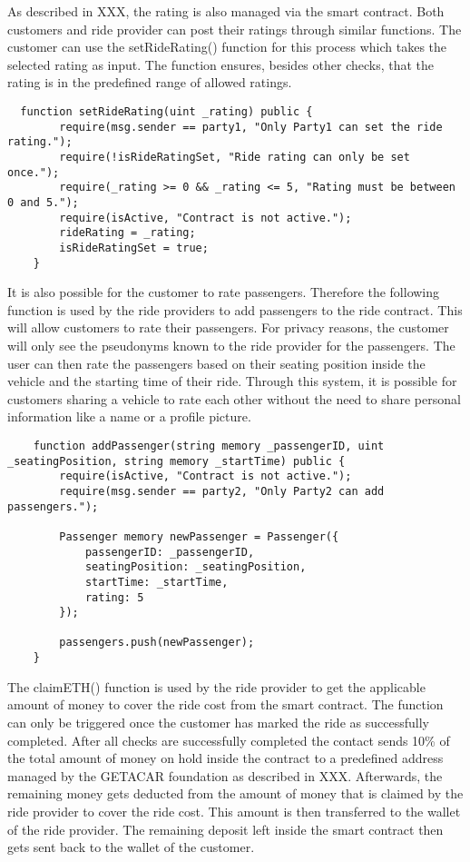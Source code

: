 As described in XXX, the rating is also managed via the smart contract. Both customers and ride provider can post their ratings through similar functions. The customer can use the setRideRating() function for this process which takes the selected rating as input.
The function ensures, besides other checks, that the rating is in the predefined range of allowed ratings. 

\lstset{
  basicstyle=\footnotesize\ttfamily,
  breaklines=true,
  numbers=left,
  firstnumber=222
}
\begin{lstlisting}
  function setRideRating(uint _rating) public {
        require(msg.sender == party1, "Only Party1 can set the ride rating.");
        require(!isRideRatingSet, "Ride rating can only be set once.");
        require(_rating >= 0 && _rating <= 5, "Rating must be between 0 and 5.");
        require(isActive, "Contract is not active.");
        rideRating = _rating;
        isRideRatingSet = true;
    }
\end{lstlisting}

It is also possible for the customer to rate passengers. Therefore the following function is used by the ride providers to add passengers to the ride contract. This will allow customers to rate their passengers. For privacy reasons, the customer will only see the pseudonyms known to the ride provider for the passengers. The user can then rate the passengers based on their seating position inside the vehicle and the starting time of their ride. Through this system, it is possible for customers sharing a vehicle to rate each other without the need to share personal information like a name or a profile picture. 

\lstset{
  basicstyle=\footnotesize\ttfamily,
  breaklines=true,
  numbers=left,
  firstnumber=53
}
\begin{lstlisting}
    function addPassenger(string memory _passengerID, uint _seatingPosition, string memory _startTime) public {
        require(isActive, "Contract is not active.");
        require(msg.sender == party2, "Only Party2 can add passengers.");

        Passenger memory newPassenger = Passenger({
            passengerID: _passengerID,
            seatingPosition: _seatingPosition,
            startTime: _startTime,
            rating: 5
        });

        passengers.push(newPassenger);
    }
\end{lstlisting}

The claimETH() function is used by the ride provider to get the applicable amount of money to cover the ride cost from the smart contract. The function can only be triggered once the customer has marked the ride as successfully completed. After all checks are successfully completed the contact sends 10\% of the total amount of money on hold inside the contract to a predefined address managed by the GETACAR foundation as described in XXX. Afterwards, the remaining money gets deducted from the amount of money that is claimed by the ride provider to cover the ride cost. This amount is then transferred to the wallet of the ride provider. The remaining deposit left inside the smart contract then gets sent back to the wallet of the customer. 

